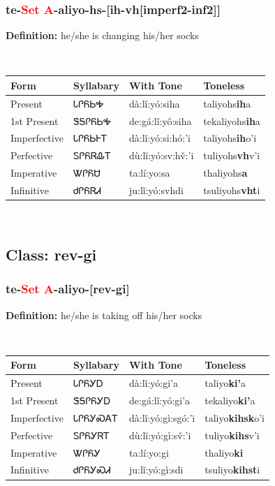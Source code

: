 \subsubsection*{te{-}\textcolor{Red}{Set A}{-}\textbf{aliyo}{-}hs{-}[ih-vh[imperf2-inf2]]}
\nopagebreak
\textbf{Definition: } he/she is changing his/her socks
\\[0.5em]
\begin{tabularx}{\textwidth}{l X X X}%
\toprule%
\textbf{Form}&\textbf{Syllabary}&\textbf{With Tone}&\textbf{Toneless}\\%
\midrule%
Present&ᏓᎵᏲᏏᎭ&dà:lǐ:yó:siha&taliyohs\textbf{ih}a\\%
1st Present&ᏕᎦᎵᏲᏏᎭ&de:gá:lǐ:yô:siha&tekaliyohs\textbf{ih}a\\%
Imperfective&ᏓᎵᏲᏏᎰᎢ&dà:lǐ:yó:si:hó:’i&taliyohs\textbf{ih}o'i\\%
Perfective&ᏚᎵᏲᏒᎲᎢ&dù:lǐ:yó:sv:hv̌:’i&tuliyohs\textbf{vh}v'i\\%
Imperative&ᏔᎵᏲᏌ&ta:lí:yo:sa&thaliyohs\textbf{a}\\%
Infinitive&ᏧᎵᏲᏒᏗ&ju:lǐ:yó:svhdi&tsuliyohs\textbf{vht}i\\%
\bottomrule%
\end{tabularx}
\\[1em]
\needspace{3in}
\subsection*{Class: rev-gi}
\nopagebreak
\needspace{2in}
\subsubsection*{te{-}\textcolor{Red}{Set A}{-}\textbf{aliyo}{-}[rev-gi]}
\nopagebreak
\textbf{Definition: } he/she is taking off his/her socks
\\[0.5em]
\begin{tabularx}{\textwidth}{l X X X}%
\toprule%
\textbf{Form}&\textbf{Syllabary}&\textbf{With Tone}&\textbf{Toneless}\\%
\midrule%
Present&ᏓᎵᏲᎩᎠ&dà:lǐ:yó:gi’a&taliyo\textbf{ki'}a\\%
1st Present&ᏕᎦᎵᏲᎩᎠ&de:gá:lǐ:yó:gi’a&tekaliyo\textbf{ki'}a\\%
Imperfective&ᏓᎵᏲᎩᏍᎪᎢ&dà:lǐ:yó:gì:sgó:’i&taliyo\textbf{kihsk}o'i\\%
Perfective&ᏚᎵᏲᎩᏒᎢ&dù:lǐ:yó:gì:sv̌:’i&tuliyo\textbf{kihs}v'i\\%
Imperative&ᏔᎵᏲᎩ&ta:lí:yo:gi&thaliyo\textbf{ki}\\%
Infinitive&ᏧᎵᏲᎩᏍᏗ&ju:lǐ:yó:gì:sdi&tsuliyo\textbf{kihst}i\\%
\bottomrule%
\end{tabularx}
\\[1em]